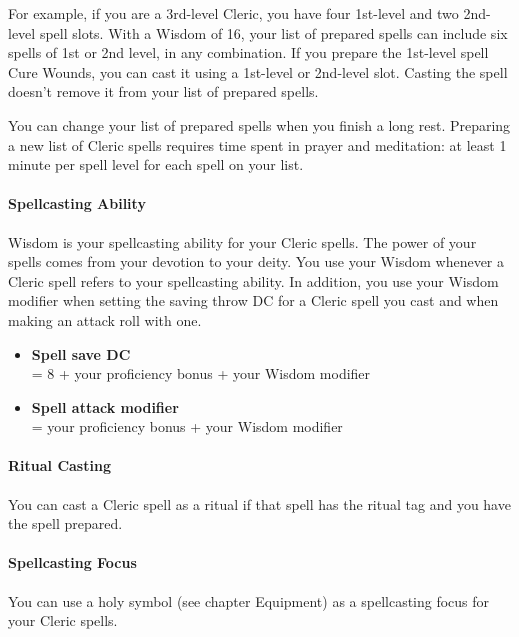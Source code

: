 For example, if you are a 3rd-level Cleric, you have four 1st-level and
two 2nd-level spell slots. With a Wisdom of 16, your list of prepared
spells can include six spells of 1st or 2nd level, in any combination.
If you prepare the 1st-level spell Cure Wounds, you can cast it using a
1st-level or 2nd-level slot. Casting the spell doesn't remove it from
your list of prepared spells.

You can change your list of prepared spells when you finish a long rest.
Preparing a new list of Cleric spells requires time spent in prayer and
meditation: at least 1 minute per spell level for each spell on your
list.

\paragraph{Spellcasting Ability}\label{Cleric_spellcasting-ability}

Wisdom is your spellcasting ability for your Cleric spells. The power of
your spells comes from your devotion to your deity. You use your Wisdom
whenever a Cleric spell refers to your spellcasting ability. In
addition, you use your Wisdom modifier when setting the saving throw DC
for a Cleric spell you cast and when making an attack roll with one.

\begin{itemize}
\item
  \textbf{Spell save DC}\\
  = 8 + your proficiency bonus + your Wisdom modifier
\item
  \textbf{Spell attack modifier}\\
  = your proficiency bonus + your Wisdom modifier
\end{itemize}

\paragraph{Ritual Casting}\label{Cleric_ritual-casting}

You can cast a Cleric spell as a ritual if that spell has the ritual tag
and you have the spell prepared.

\paragraph{Spellcasting Focus}\label{Cleric_spellcasting-focus}

You can use a holy symbol (see chapter Equipment) as a spellcasting
focus for your Cleric spells.

